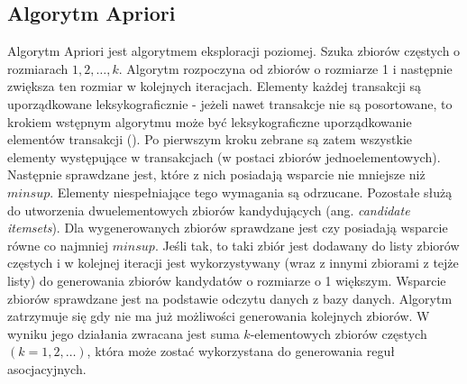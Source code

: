 \subsection{Algorytm Apriori \cite{Agrawal}}
\label{c321}
Algorytm Apriori jest algorytmem eksploracji poziomej. Szuka zbiorów częstych o rozmiarach \(1, 2,\dots , k\). Algorytm rozpoczyna od zbiorów o rozmiarze 1 i następnie zwiększa ten rozmiar w kolejnych iteracjach. Elementy każdej transakcji są uporządkowane leksykograficznie - jeżeli nawet transakcje nie są posortowane, to krokiem wstępnym algorytmu może być leksykograficzne uporządkowanie elementów transakcji (\cite{Morzy}). Po pierwszym kroku zebrane są zatem wszystkie elementy występujące w transakcjach (w postaci zbiorów jednoelementowych). Następnie sprawdzane jest, które z nich posiadają wsparcie nie mniejsze niż \(minsup\). Elementy niespełniające tego wymagania są odrzucane. Pozostałe służą do utworzenia dwuelementowych zbiorów kandydujących (ang. \textit{candidate itemsets}). Dla wygenerowanych zbiorów sprawdzane jest czy posiadają wsparcie równe co najmniej \(minsup\). Jeśli tak, to taki zbiór jest dodawany do listy zbiorów częstych i w kolejnej iteracji jest wykorzystywany (wraz z innymi zbiorami z tejże listy) do generowania zbiorów kandydatów o rozmiarze o 1 większym. Wsparcie zbiorów sprawdzane jest na podstawie odczytu danych z bazy danych. Algorytm zatrzymuje się gdy nie ma już możliwości generowania kolejnych zbiorów. W wyniku jego działania zwracana jest suma \(k\)-elementowych zbiorów częstych \((k = 1, 2,\dots)\), która może zostać wykorzystana do generowania reguł asocjacyjnych.

